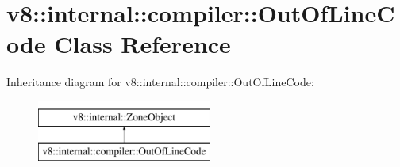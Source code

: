 \hypertarget{classv8_1_1internal_1_1compiler_1_1OutOfLineCode}{}\section{v8\+:\+:internal\+:\+:compiler\+:\+:Out\+Of\+Line\+Code Class Reference}
\label{classv8_1_1internal_1_1compiler_1_1OutOfLineCode}
Inheritance diagram for v8\+:\+:internal\+:\+:compiler\+:\+:Out\+Of\+Line\+Code\+:\begin{figure}[H]
\begin{center}
\leavevmode
\includegraphics[height=2.000000cm]{classv8_1_1internal_1_1compiler_1_1OutOfLineCode}
\end{center}
\end{figure}
